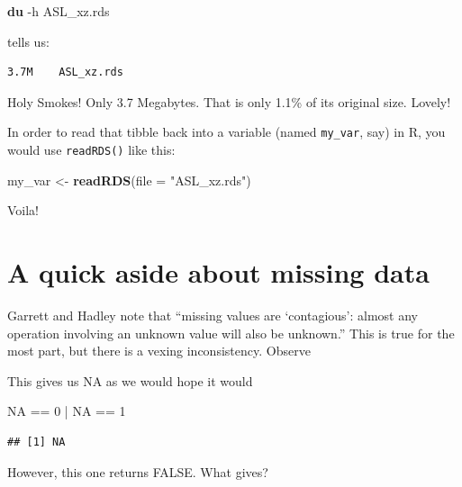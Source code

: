 \documentclass[]{book}
\newenvironment{Shaded}{\begin{snugshade}}{\end{snugshade}}
\newcommand{\KeywordTok}[1]{\textcolor[rgb]{0.13,0.29,0.53}{\textbf{{#1}}}}
\newcommand{\DataTypeTok}[1]{\textcolor[rgb]{0.13,0.29,0.53}{{#1}}}
\newcommand{\DecValTok}[1]{\textcolor[rgb]{0.00,0.00,0.81}{{#1}}}
\newcommand{\StringTok}[1]{\textcolor[rgb]{0.31,0.60,0.02}{{#1}}}
\newcommand{\OtherTok}[1]{\textcolor[rgb]{0.56,0.35,0.01}{{#1}}}
\newcommand{\NormalTok}[1]{{#1}}
\theoremstyle{definition}
\theoremstyle{definition}
\theoremstyle{remark}
\begin{document}
\begin{Shaded}
\begin{Highlighting}[]
\KeywordTok{du} \NormalTok{-h ASL_xz.rds}
\end{Highlighting}
\end{Shaded}

tells us:

\begin{verbatim}
3.7M    ASL_xz.rds
\end{verbatim}

Holy Smokes! Only 3.7 Megabytes. That is only 1.1\% of its original
size. Lovely!

In order to read that tibble back into a variable (named
\texttt{my\_var}, say) in R, you would use \texttt{readRDS()} like this:

\begin{Shaded}
\begin{Highlighting}[]
\NormalTok{my_var <-}\StringTok{ }\KeywordTok{readRDS}\NormalTok{(}\DataTypeTok{file =} \StringTok{"ASL_xz.rds"}\NormalTok{)}
\end{Highlighting}
\end{Shaded}

Voila!

\section{A quick aside about missing
data}\label{a-quick-aside-about-missing-data}

Garrett and Hadley note that ``missing values are `contagious': almost
any operation involving an unknown value will also be unknown.'' This is
true for the most part, but there is a vexing inconsistency. Observe

This gives us NA as we would hope it would

\begin{Shaded}
\begin{Highlighting}[]
\OtherTok{NA} \NormalTok{==}\StringTok{ }\DecValTok{0} \NormalTok{|}\StringTok{ }\OtherTok{NA} \NormalTok{==}\StringTok{ }\DecValTok{1}
\end{Highlighting}
\end{Shaded}

\begin{verbatim}
## [1] NA
\end{verbatim}

However, this one returns FALSE. What gives?

\begin{Shaded}
\end{Shaded}
\end{document}
